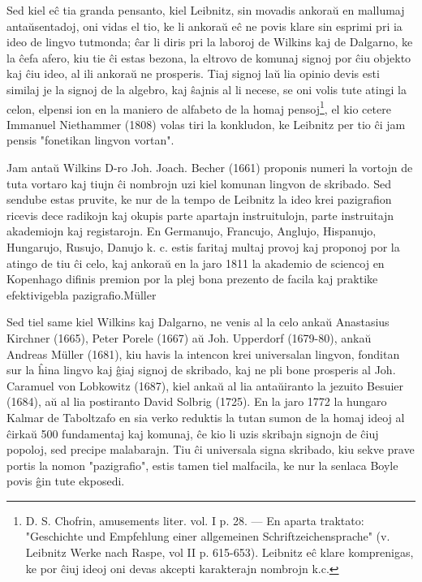    Sed kiel e\^c tia granda pensanto, kiel Leibnitz, sin movadis ankora\u u
en mallumaj anta\u usentadoj, oni vidas el tio, ke li ankora\u u
e\^c ne povis klare sin esprimi pri ia ideo de lingvo tutmonda;
\^car li diris pri la laboroj de Wilkins kaj de Dalgarno, ke la
\^cefa afero, kiu tie \^ci estas bezona, la eltrovo de komunaj
signoj por \^ciu objekto kaj \^ciu ideo, al ili ankora\u u ne
prosperis. Tiaj signoj la\u u lia opinio devis esti similaj je la
signoj de la algebro, kaj \^sajnis al li necese, se oni volis tute
atingi la celon, elpensi ion en la maniero de alfabeto de la homaj
pensoj\footnote{D. S. Chofrin, amusements liter. vol. I p. 28.
--- En aparta traktato: "Geschichte und Empfehlung einer allgemeinen
Schriftzeichensprache" (v. Leibnitz Werke nach Raspe, vol II p.
615-653). Leibnitz e\^c klare komprenigas, ke por \^ciuj ideoj oni
devas akcepti karakterajn nombrojn k.c.}, el kio cetere Immanuel Niethammer (1808) volas tiri la
konkludon, ke Leibnitz per tio \^ci jam pensis "fonetikan lingvon
vortan".

   Jam anta\u u Wilkins D-ro Joh. Joach. Becher (1661) proponis numeri
la vortojn de tuta vortaro kaj tiujn \^ci nombrojn uzi kiel komunan
lingvon de skribado. Sed sendube estas pruvite, ke nur de la tempo
de Leibnitz la ideo krei pazigrafion ricevis dece radikojn kaj
okupis parte apartajn instruitulojn, parte instruitajn akademiojn
kaj registarojn. En Germanujo, Francujo, Anglujo, Hispanujo,
Hungarujo, Rusujo, Danujo k. c. estis faritaj multaj provoj kaj
proponoj por la atingo de tiu \^ci celo, kaj ankora\u u en la jaro
1811 la akademio de sciencoj en Kopenhago difinis premion por la
plej bona prezento de facila kaj praktike efektivigebla pazigrafio.Müller

   Sed tiel same kiel Wilkins kaj Dalgarno, ne venis al la celo anka\u u
Anastasius Kirchner (1665), Peter Porele (1667) a\u u Joh. Upperdorf
(1679-80), anka\u u Andreas Müller (1681), kiu havis la intencon
krei universalan lingvon, fonditan sur la \^hina lingvo kaj \^giaj
signoj de skribado, kaj ne pli bone prosperis al Joh. Caramuel von
Lobkowitz (1687), kiel anka\u u al lia anta\u uiranto la jezuito
Besuier (1684), a\u u al lia postiranto David Solbrig (1725). En la
jaro 1772 la hungaro Kalmar de Taboltzafo en sia verko reduktis la
tutan sumon de la homaj ideoj al \^cirka\u u 500 fundamentaj kaj
komunaj, \^ce kio li uzis skribajn signojn de \^ciuj popoloj, sed
precipe malabarajn. Tiu \^ci universala signa skribado, kiu sekve
prave portis la nomon "pazigrafio", estis tamen tiel malfacila, ke
nur la senlaca Boyle povis \^gin tute ekposedi.

